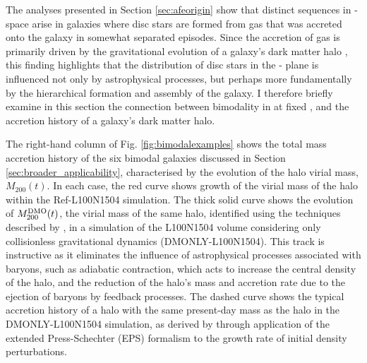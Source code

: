 The analyses presented in Section \ref{sec:afeorigin} show that distinct sequences in \afe{}-\feh{} space arise in galaxies where disc stars are formed from gas that was accreted onto the galaxy in somewhat separated episodes. Since the accretion of gas is primarily driven by the gravitational evolution of a galaxy's dark matter halo \citep{2008MNRAS.388.1792N,2010MNRAS.406.2267F,2015MNRAS.450.1521C,2015MNRAS.450.1514C,2015MNRAS.452.1217C}, this finding highlights that the distribution of disc stars in the \afe{}-\feh{} plane is influenced not only by astrophysical processes, but perhaps more fundamentally by the hierarchical formation and assembly of the galaxy. I therefore briefly examine in this section the connection between bimodality in \afe{} at fixed \feh{}, and the accretion history of a galaxy's dark matter halo.

The right-hand column of Fig. \ref{fig:bimodalexamples} shows the total mass accretion history of the six bimodal galaxies discussed in Section \ref{sec:broader_applicability}, characterised by the evolution of the halo virial mass, $M_{200}(t)$. In each case, the red curve shows growth of the virial mass of the halo within the Ref-L100N1504 simulation. The thick solid curve shows the evolution of $M_{200}^{\rm DMO}(t)$, the virial mass of the same halo, identified using the techniques described by \citet{2015MNRAS.453L..58S}, in a simulation of the L100N1504 volume considering only collisionless gravitational dynamics (DMONLY-L100N1504). This track is instructive as it eliminates the influence of astrophysical processes associated with baryons, such as adiabatic contraction, which acts to increase the central density of the halo, and the reduction of the halo's mass and accretion rate due to the ejection of baryons by feedback processes. The dashed curve shows the typical accretion history of a halo with the same present-day mass as the halo in the DMONLY-L100N1504 simulation, as derived by \citet{2015MNRAS.450.1514C} through application of the extended Press-Schechter (EPS) formalism to the growth rate of initial density perturbations.

